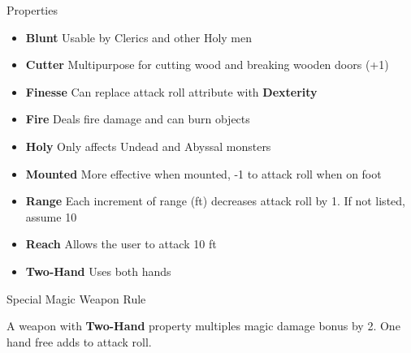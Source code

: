 \documentclass[18pt]{article}
\begin{document}
\begin{multicols}{2}
\begin{mercHeading}
Properties
\end{mercHeading}
\begin{itemize}
\setlength\itemsep{0em}
	\item \textbf{Blunt} Usable by Clerics and other Holy men
	\item \textbf{Cutter} Multipurpose for cutting wood and breaking wooden doors (+1)
	\item \textbf{Finesse} Can replace attack roll attribute with \textbf{Dexterity}
	\item \textbf{Fire} Deals fire damage and can burn objects
	\item \textbf{Holy} Only affects Undead and Abyssal monsters
	\item \textbf{Mounted} More effective when mounted, -1 to attack roll when on foot
	\item \textbf{Range} Each increment of range (ft) decreases attack roll by 1. If not listed, assume 10
	\item \textbf{Reach} Allows the user to attack 10 ft
	\item \textbf{Two-Hand} Uses both hands
\end{itemize}
\begin{mercHeading}
Special Magic Weapon Rule
\end{mercHeading}
A weapon with \textbf{Two-Hand} property multiples magic damage bonus by 2. One hand free adds to attack roll.

\end{multicols}
\end{document}
